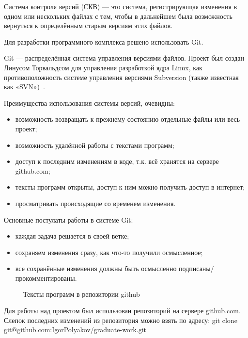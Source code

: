 Система контроля версий (СКВ) — это система, регистрирующая изменения в одном или нескольких файлах с тем, чтобы в дальнейшем была возможность вернуться к определённым старым версиям этих файлов.

Для разработки программного комплекса решено использовать Git.

Git  — распределённая система управления версиями файлов. Проект был создан Линусом Торвальдсом для управления разработкой ядра Linux, как противоположность системе управления версиями Subversion (также известная как «SVN»)~\cite{progit}.

Преимущества использования системы версий, очевидны:
\begin{itemize}
\item возможность возвращать к прежнему состоянию отдельные файлы или весь проект;
\item возможность удалённой работы с текстами программ;
\item доступ к последним изменениям в коде, т.к. всё хранятся на сервере github.com;
\item тексты программ открыты, доступ к ним можно получить доступ в интернет;
\item просматривать происходящие со временем изменения.
\end{itemize}

Основные постулаты работы в системе Git:
\begin{itemize}
\item каждая задача решается в своей ветке;
\item сохраняем изменения сразу, как что-то получили осмысленное;
\item все сохранённые изменения должны быть осмысленно подписаны/прокомментированы.
\end{itemize}
\begin{figure}[ht]
\caption{Тексты программ в репозитории github}
\label{pic:github}
\end{figure}

Для работы над проектом был использован репозиторий на сервере github.com. Слепок последних изменений из репозитория можно взять по адресу: git clone git@github.com:IgorPolyakov/graduate-work.git

